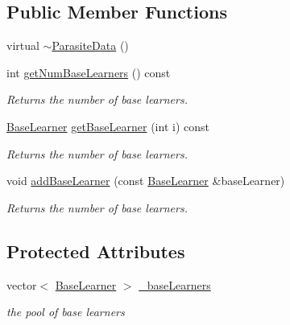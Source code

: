 \subsection*{Public Member Functions}
\begin{DoxyCompactItemize}
\item 
virtual \hyperlink{classMultiBoost_1_1ParasiteData_a5a27758ac53e36aa5f611dc6d1cb9c54}{$\sim$\-Parasite\-Data} ()
\item 
\hypertarget{classMultiBoost_1_1ParasiteData_a7b7db8ae0b517968a028b292b8ae7ad8}{int \hyperlink{classMultiBoost_1_1ParasiteData_a7b7db8ae0b517968a028b292b8ae7ad8}{get\-Num\-Base\-Learners} () const }\label{classMultiBoost_1_1ParasiteData_a7b7db8ae0b517968a028b292b8ae7ad8}

\begin{DoxyCompactList}\small\item\em Returns the number of base learners. \end{DoxyCompactList}\item 
\hypertarget{classMultiBoost_1_1ParasiteData_ac8049ab731e384d40d736b30f9c743ea}{\hyperlink{classMultiBoost_1_1BaseLearner}{Base\-Learner} \hyperlink{classMultiBoost_1_1ParasiteData_ac8049ab731e384d40d736b30f9c743ea}{get\-Base\-Learner} (int i) const }\label{classMultiBoost_1_1ParasiteData_ac8049ab731e384d40d736b30f9c743ea}

\begin{DoxyCompactList}\small\item\em Returns the number of base learners. \end{DoxyCompactList}\item 
\hypertarget{classMultiBoost_1_1ParasiteData_a16837f64d3bd186d5453e7b9b1188e9e}{void \hyperlink{classMultiBoost_1_1ParasiteData_a16837f64d3bd186d5453e7b9b1188e9e}{add\-Base\-Learner} (const \hyperlink{classMultiBoost_1_1BaseLearner}{Base\-Learner} \&base\-Learner)}\label{classMultiBoost_1_1ParasiteData_a16837f64d3bd186d5453e7b9b1188e9e}

\begin{DoxyCompactList}\small\item\em Returns the number of base learners. \end{DoxyCompactList}\end{DoxyCompactItemize}
\subsection*{Protected Attributes}
\begin{DoxyCompactItemize}
\item 
\hypertarget{classMultiBoost_1_1ParasiteData_a8847c05fa06f93d9d809f3e56c15d8bb}{vector$<$ \hyperlink{classMultiBoost_1_1BaseLearner}{Base\-Learner} $>$ \hyperlink{classMultiBoost_1_1ParasiteData_a8847c05fa06f93d9d809f3e56c15d8bb}{\-\_\-base\-Learners}}\label{classMultiBoost_1_1ParasiteData_a8847c05fa06f93d9d809f3e56c15d8bb}

\begin{DoxyCompactList}\small\item\em the pool of base learners \end{DoxyCompactList}\end{DoxyCompactItemize}


